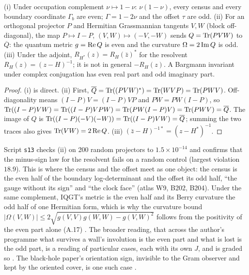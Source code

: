 \begin{proposition}\label{prop:parity}
(i) Under occupation complement $\nu\mapsto1-\nu$: $\nu(1-\nu)$, every census and every boundary coordinate $\Gamma_b$ are even; $\Gamma=1-2\nu$ and the offset $\tau$ are odd. (ii) For an orthogonal projector $P$ and Hermitian Grassmannian tangents $V,W$ (block off-diagonal), the map $P\mapsto I-P$, $(V,W)\mapsto(-V,-W)$ sends $Q=\operatorname{Tr}(PVW)$ to $\overline Q$: the quantum metric $g=\operatorname{Re} Q$ is even and the curvature $\Omega=2\operatorname{Im} Q$ is odd. (iii) Under the adjoint, $R_{H^*}(z)=R_H(\bar z)^*$ for the resolvent $R_H(z)=(z-H)^{-1}$; it is not in general $-R_H(z)$. A Bargmann invariant under complex conjugation has even real part and odd imaginary part. 
\end{proposition}
\begin{proof}
(i) is direct. (ii) First, $\overline Q=\operatorname{Tr}((PVW)^*)=\operatorname{Tr}(WVP)=\operatorname{Tr}(PWV)$. Off-diagonality means $(I-P)V=(I-P)VP$ and $PW=PW(I-P)$, so $\operatorname{Tr}((I-P)VW)=\operatorname{Tr}((I-P)VPW)=\operatorname{Tr}(PW(I-P)V)=\operatorname{Tr}(PWV)=\overline Q$. The image of $Q$ is $\operatorname{Tr}((I-P)(-V)(-W))=\operatorname{Tr}((I-P)VW)=\overline Q$; summing the two traces also gives $\operatorname{Tr}(VW)=2\operatorname{Re} Q$. (iii) $(\bar z-H)^{-1*}=(z-H^*)^{-1}$.
\end{proof}
Script \texttt{s13} checks (ii) on 200 random projectors to $1.5\times10^{-14}$ and confirms that the minus-sign law for the resolvent fails on a random control (largest violation $18.9$). This is where the census and the offset meet as one object: the census is the even half of the boundary log-determinant and the offset its odd half, ``the gauge without its sign'' and ``the clock face'' (atlas W9, B202, B204). Under the same complement, IQGT's metric is the even half and its Berry curvature the odd half of one Hermitian form, which is why the curvature bound $|\Omega(V,W)|\le2\sqrt{g(V,V)g(W,W)-g(V,W)^2}$ follows from the positivity of the even part alone (A.17) . The broader reading, that across the author's programme what survives a wall's involution is the even part and what is lost is the odd part, is a reading of particular cases, each with its own $J$, and is graded so . The black-hole paper's orientation sign, invisible to the Gram observer and kept by the oriented cover, is one such case .

